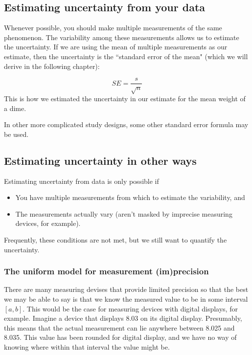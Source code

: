 \documentclass[twoside]{book}\usepackage[]{graphicx}\usepackage[]{xcolor}
\newcounter{example}[section]
\begin{document}
\subsection{Estimating uncertainty from your data}
\label{sec:uncertainty-from-data}

Whenever possible, you should make multiple measurements of the same phenomenon.
The variability among these measurements allows us to estimate the uncertainty.
If we are using the mean of multiple measurements as our estimate, then the uncertainty
is the ``standard error of the mean" (which we will derive in the following chapter):

\[ 
SE = \frac{s}{\sqrt{n}} 
\]
This is how we estimated the uncertainty in our estimate for the mean weight of a dime.

In other more complicated study designs, some other standard error formula may be used.

\subsection{Estimating uncertainty in other ways}
\label{sec:uncertainty-without-data}
Estimating uncertainty from data is only possible if 
\begin{itemize}
\item You have multiple measurements from which to estimate the variability, and 
\item The measurements actually vary (aren't masked by imprecise measuring devices, 
for example).
\end{itemize}

Frequently, these conditions are not met, but we still want to quantify the uncertainty.

\subsubsection{The uniform model for measurement (im)precision}
There are many measuring devises that provide limited precision so that the 
best we may be able to say is that we know the measured value to be in some interval $[a,b]$.
This would be the case for measuring devices with digital displays, for example.  
Imagine a device that displays 8.03 on its digital display.  
Presumably, this means that the actual measurement can lie anywhere between 
8.025 and 8.035.  This value has been rounded for digital display, and we 
have no way of knowing where within that interval the value might be.
\end{document}
